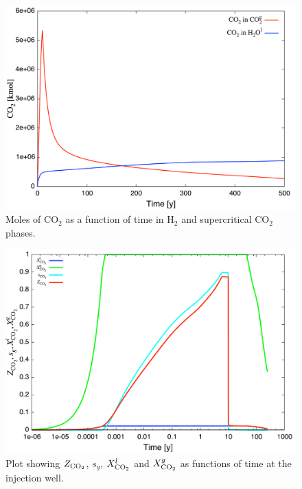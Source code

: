 \documentclass[12pt]{article}
\renewcommand{\c}{{\rm CO_2}}
\begin{document}
\begin{figure}\centering
\includegraphics[scale=0.45]{./figs/mass}
\caption{Moles of CO$_2$ as a function of time in H$_2$ and supercritical CO$_2$ phases.}\label{fmass}
\end{figure}

\begin{figure}\centering
\includegraphics[scale=0.45]{./figs/zco2}
\caption{Plot showing $Z_\c$, $s_g$, $X_\c^l$ and $X_\c^g$ as functions of time at the injection well.}\label{fzco2}
\end{figure}

\newpage
\end{document}
